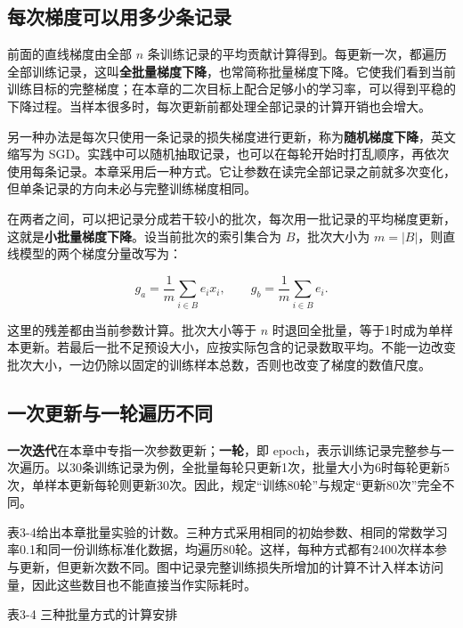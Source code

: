 \subsection{每次梯度可以用多少条记录}

前面的直线梯度由全部 \(n\) 条训练记录的平均贡献计算得到。每更新一次，都遍历全部训练记录，这叫\textbf{全批量梯度下降}，也常简称批量梯度下降。它使我们看到当前训练目标的完整梯度；在本章的二次目标上配合足够小的学习率，可以得到平稳的下降过程。当样本很多时，每次更新前都处理全部记录的计算开销也会增大。

另一种办法是每次只使用一条记录的损失梯度进行更新，称为\textbf{随机梯度下降}，英文缩写为 SGD。实践中可以随机抽取记录，也可以在每轮开始时打乱顺序，再依次使用每条记录。本章采用后一种方式。它让参数在读完全部记录之前就多次变化，但单条记录的方向未必与完整训练梯度相同。

在两者之间，可以把记录分成若干较小的批次，每次用一批记录的平均梯度更新，这就是\textbf{小批量梯度下降}。设当前批次的索引集合为 \(B\)，批次大小为 \(m = |B|\)，则直线模型的两个梯度分量改写为：

\[g_{a} = \frac{1}{m}\sum_{i \in B}^{}e_{i}x_{i},\quad\quad g_{b} = \frac{1}{m}\sum_{i \in B}^{}e_{i}.\]

这里的残差都由当前参数计算。批次大小等于 \(n\) 时退回全批量，等于1时成为单样本更新。若最后一批不足预设大小，应按实际包含的记录数取平均。不能一边改变批次大小，一边仍除以固定的训练样本总数，否则也改变了梯度的数值尺度。

\subsection{一次更新与一轮遍历不同}

\textbf{一次迭代}在本章中专指一次参数更新；\textbf{一轮}，即 epoch，表示训练记录完整参与一次遍历。以30条训练记录为例，全批量每轮只更新1次，批量大小为6时每轮更新5次，单样本更新每轮则更新30次。因此，规定``训练80轮''与规定``更新80次''完全不同。

表3-4给出本章批量实验的计数。三种方式采用相同的初始参数、相同的常数学习率0.1和同一份训练标准化数据，均遍历80轮。这样，每种方式都有2400次样本参与更新，但更新次数不同。图中记录完整训练损失所增加的计算不计入样本访问量，因此这些数目也不能直接当作实际耗时。

表3-4 三种批量方式的计算安排

